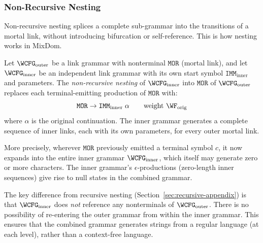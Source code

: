 \subsubsection{Non-Recursive Nesting}
\label{sec:nonrecursive-appendix}

Non-recursive nesting splices a complete sub-grammar into the
transitions of a mortal link, without introducing bifurcation
or self-reference.  This is how nesting works in MixDom.

\begin{definition}
\label{def:nonrec-nest-appendix}
Let $\WCFG_{\mathrm{outer}}$ be a link grammar with nonterminal
$\texttt{MOR}$ (mortal link), and let $\WCFG_{\mathrm{inner}}$ be
an independent link grammar with its own start symbol
$\texttt{IMM}_{\mathrm{inner}}$ and parameters.
The \emph{non-recursive nesting} of $\WCFG_{\mathrm{inner}}$
into $\texttt{MOR}$ of $\WCFG_{\mathrm{outer}}$ replaces
each terminal-emitting production of $\texttt{MOR}$ with:
\begin{equation}
\texttt{MOR} \to \texttt{IMM}_{\mathrm{inner}}\;\alpha
\qquad \text{weight } \WF_{\mathrm{orig}}
\end{equation}
where $\alpha$ is the original continuation.
The inner grammar generates a complete sequence of inner links,
each with its own parameters, for every outer mortal link.

More precisely, wherever $\texttt{MOR}$ previously emitted a terminal
symbol $c$, it now expands into the entire inner grammar
$\WCFG_{\mathrm{inner}}$, which itself may generate zero or more
characters.  The inner grammar's $\epsilon$-productions
(zero-length inner sequences) give rise to null states
in the combined grammar.
\end{definition}

\begin{remark}
The key difference from recursive nesting (Section~\ref{sec:recursive-appendix})
is that $\WCFG_{\mathrm{inner}}$ does \emph{not} reference any
nonterminals of $\WCFG_{\mathrm{outer}}$.  There is no possibility
of re-entering the outer grammar from within the inner grammar.
This ensures that the combined grammar generates strings from
a regular language (at each level), rather than a context-free language.
\end{remark}

